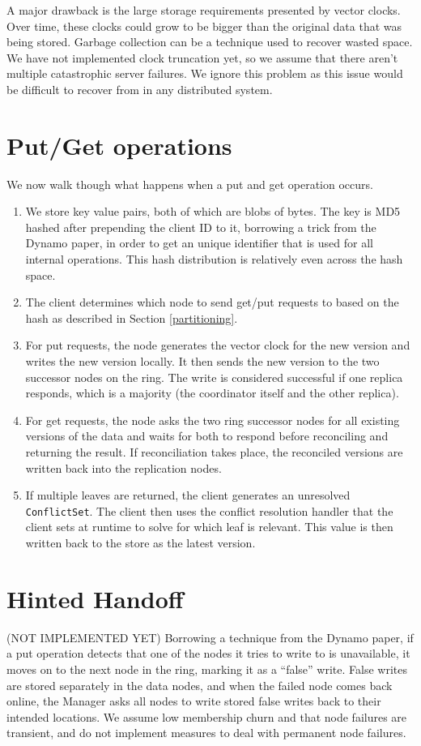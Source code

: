 \documentclass[paper=a4,fontsize=11pt]{report} %
\numberwithin{equation}{section} %
\numberwithin{figure}{section} %
\numberwithin{table}{section} %
\begin{document}
A major drawback is the large storage requirements presented by vector clocks. Over time, these clocks could grow to be bigger than the original data that was being stored. Garbage collection can be a technique used to recover wasted space. We have not implemented clock truncation yet, so we assume that there aren't multiple catastrophic server failures. We ignore this problem as this issue would be difficult to recover from in any distributed system.

\section{Put/Get operations}
We now walk though what happens when a put and get operation occurs.

\begin{enumerate}
\item We store key value pairs, both of which are blobs of bytes. The key is MD5 hashed after prepending the client ID to it, borrowing a trick from the Dynamo paper, in order to get an unique identifier that is used for all internal operations. This hash distribution is relatively even across the hash space.
\item The client determines which node to send get/put requests to based on the hash as described in Section \ref{partitioning}.
\item For put requests, the node generates the vector clock for the new version and writes the new version locally. It then sends the new version to the two successor nodes on the ring. The write is considered successful if one replica responds, which is a majority (the coordinator itself and the other replica).
\item For get requests, the node asks the two ring successor nodes for all existing versions of the data and waits for both to respond before reconciling and returning the result. If reconciliation takes place, the reconciled versions are written back into the replication nodes.
\item If multiple leaves are returned, the client generates an unresolved \texttt{ConflictSet}. The client then uses the conflict resolution handler that the client sets at runtime to solve for which leaf is relevant. This value is then written back to the store as the latest version.
\end{enumerate}

\section{Hinted Handoff} (NOT IMPLEMENTED YET)
Borrowing a technique from the Dynamo paper, if a put operation detects that one of the nodes it tries to write to is unavailable, it moves on to the next node in the ring, marking it as a ``false'' write. False writes are stored separately in the data nodes, and when the failed node comes back online, the Manager asks all nodes to write stored false writes back to their intended locations. We assume low membership churn and that node failures are transient, and do not implement measures to deal with permanent node failures.
\end{document}

